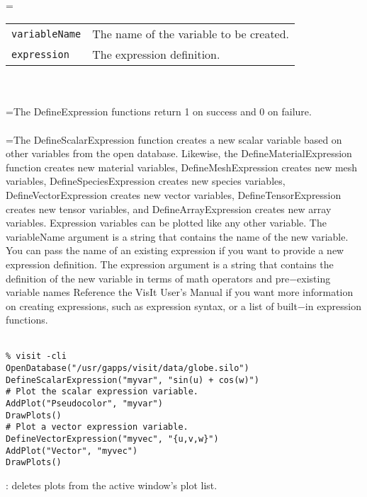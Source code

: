 \documentclass[10pt,a4paper]{report}
\begin{document}
 \\ 
\hangindent=\parindent 
\begin{tabular}{ll}
\verb!variableName! & The name of the variable to be created. \\
\verb!expression! & The expression definition. \\
\end{tabular} \\[-2mm]


 \\ 
\hangindent=\parindent The DefineExpression functions return 1 on success and 0 on failure. \\[-3mm] 

 \\ 
\hangindent=\parindent The DefineScalarExpression function creates a new scalar variable based on other variables from the open database. Likewise, the DefineMaterialExpression function creates new material variables, DefineMeshExpression creates new mesh variables, DefineSpeciesExpression creates new species variables, DefineVectorExpression creates new vector variables, DefineTensorExpression creates new tensor variables, and DefineArrayExpression creates new array variables. Expression variables can be plotted like any other variable. The variableName argument is a string that contains the name of the new variable. You can pass the name of an existing expression if you want to provide a new expression definition. The expression argument is a string that contains the definition of the new variable in terms of math operators and pre$-$existing variable names Reference the VisIt User's Manual if you want more information on  creating expressions, such as expression syntax, or a list of built$-$in expression functions. \\[-3mm] 

\\[-6mm]
\begin{verbatim}% visit -cli
OpenDatabase("/usr/gapps/visit/data/globe.silo")
DefineScalarExpression("myvar", "sin(u) + cos(w)")
# Plot the scalar expression variable.
AddPlot("Pseudocolor", "myvar")
DrawPlots()
# Plot a vector expression variable.
DefineVectorExpression("myvec", "{u,v,w}")
AddPlot("Vector", "myvec")
DrawPlots()
\end{verbatim}
\newpage


{}
: deletes plots from the active window's plot list.\\[-3mm]
\end{document}
